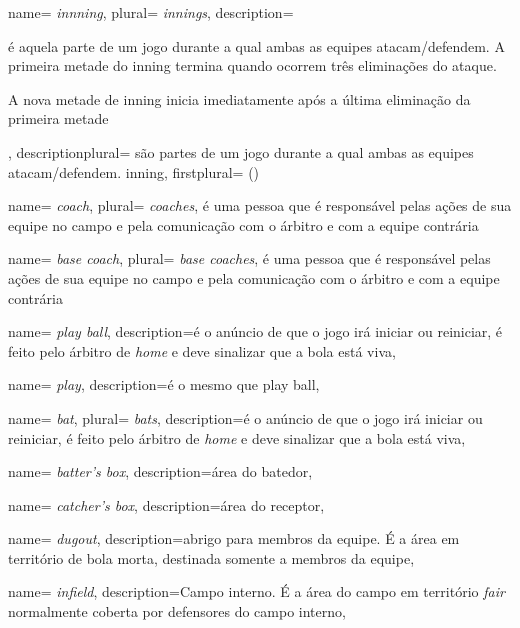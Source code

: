 
{
 name= \textit{innning},
 plural= \textit{innings},
 description={ \'e aquela parte de um jogo durante a qual ambas as equipes atacam/defendem. A primeira metade do inning termina quando ocorrem tr\^es elimina\c{c}\~oes do ataque.\par A nova metade de \gls{inning} inicia imediatamente após a última elimina\c{c}\~ao da primeira metade},
 descriptionplural={ s\~ao partes de um jogo durante a qual ambas as equipes atacam/defendem. \gls{inning}},
 firstplural={ ()}
}

{
 name= \textit{coach},
 plural= \textit{coaches},
}{\'e uma pessoa que \'e respons\'avel pelas a\c{c}\~oes de sua equipe no campo e pela comuni\-ca\-\c{c}\~ao com o \'arbitro e com a equipe contr\'aria}

{
 name= \textit{base coach},
 plural= \textit{base coaches},
}{\'e uma pessoa que \'e respons\'avel pelas a\c{c}\~oes de sua equipe no campo e pela comuni\-ca\-\c{c}\~ao com o \'arbitro e com a equipe contr\'aria}


{
 name= \textit{play ball},
 description={\'e o an\'uncio de que o jogo ir\'a iniciar ou reiniciar, \'e feito pelo \'arbitro de \textit{home} e deve sinalizar que a bola est\'a viva},
}

{
 name= \textit{play},
 description={\'e o mesmo que \gls{play ball}},
}

{
 name= \textit{bat},
 plural= \textit{bats},
 description={\'e o an\'uncio de que o jogo ir\'a iniciar ou reiniciar, \'e feito pelo \'arbitro de \textit{home} e deve sinalizar que a bola est\'a viva},
}

{
 name= \textit{batter's box},
 description={\'area do batedor},
}

{
 name= \textit{catcher's box},
 description={\'area do receptor},
}

{
 name= \textit{dugout},
 description={abrigo para membros da equipe. \'E a \'area em territ\'orio de bola morta, destinada somente a membros da equipe},
}

{
 name= \textit{infield},
 description={Campo interno. \'E a \'area do campo em territ\'orio \textit{fair} normalmente coberta por defensores do campo interno},
}


